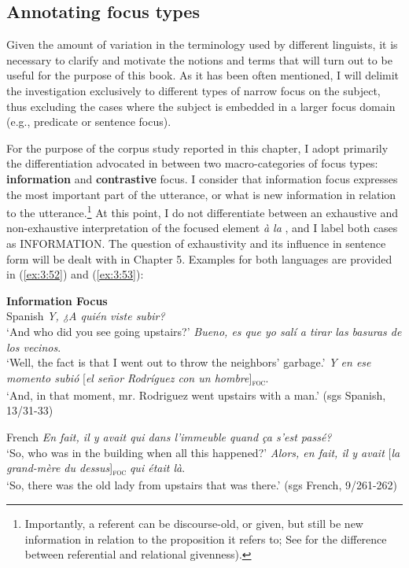 \subsection{Annotating focus types}

Given the amount of variation in the terminology used by different linguists, it is necessary to clarify and motivate the notions and terms that will turn out to be useful for the purpose of this book. As it has been often mentioned, I will delimit the investigation exclusively to different types of narrow focus on the subject, thus excluding the cases where the subject is embedded in a larger focus domain (e.g., predicate or sentence focus).

For the purpose of the corpus study reported in this chapter, I adopt primarily the differentiation advocated in \textcite{krifka2008basic} between two macro-categories of focus types: \textbf{information} and \textbf{contrastive} focus. I consider that information focus expresses the most important part of the utterance, or what is new information in relation to the utterance.\footnote{Importantly, a referent can be discourse-old, or given, but still be new information in relation to the proposition it refers to; See \textcite{gundel2004topic} for the difference between referential and relational givenness).} At this point, I do not differentiate between an exhaustive and non-exhaustive interpretation of the focused element  \textit{à la} \textcite{kiss1998identificational}, and I label both cases as {\selectfont INFORMATION}. The question of exhaustivity and its influence in sentence form will be dealt with in Chapter 5. Examples for both languages are provided in (\ref{ex:3:52}) and (\ref{ex:3:53}): 

\textbf{Information Focus}\\
 \ea \label{ex:3:52} Spanish
\ea	\textit{Y, ¿A quién viste subir?} \\
 `And who did you see going upstairs?'
\textit{Bueno, es que yo salí a tirar las basuras de los vecinos}.\\
 ‘Well, the fact is that I went out to throw the neighbors' garbage.'
\ex \textit{Y en ese momento subió} {[\textit{el señor Rodríguez con un hombre}}]\textsubscript{\textsc{foc}}\normalsize. \\
‘And, in that moment, mr. Rodriguez went upstairs with a man.' 
\hfill (sgs Spanish, 13/31-33)
\z
\z

 \ea \label{ex:3:53} French
\ea	\textit{En fait, il y avait qui dans l'immeuble quand ça s'est passé?}\\
 ‘So, who was in the building when all this happened?'
\ex \textit{Alors, en fait, il y avait} {[\textit{la grand-mère du dessus}]\textsubscript{\textsc{foc}}} \normalsize \textit{qui était là}.  \\
‘So, there was the old lady from upstairs that was there.' \hfill (sgs French, 9/261-262)    
\z \z


